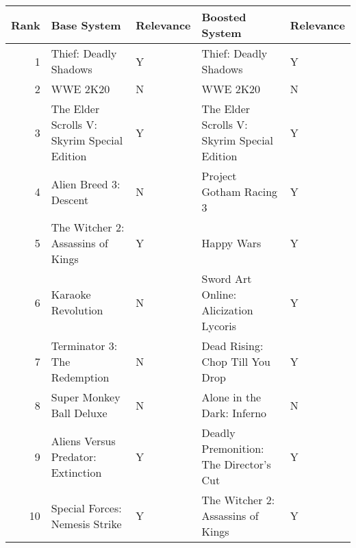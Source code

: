 \begin{tabular}{rllll}
\toprule
 Rank &                                 Base System & Relevance &                              Boosted System & Relevance \\
\midrule
    1 &                       Thief: Deadly Shadows &         Y &                       Thief: Deadly Shadows &         Y \\
    2 &                                    WWE 2K20 &         N &                                    WWE 2K20 &         N \\
    3 & The Elder Scrolls V: Skyrim Special Edition &         Y & The Elder Scrolls V: Skyrim Special Edition &         Y \\
    4 &                      Alien Breed 3: Descent &         N &                     Project Gotham Racing 3 &         Y \\
    5 &           The Witcher 2: Assassins of Kings &         Y &                                  Happy Wars &         Y \\
    6 &                          Karaoke Revolution &         N &       Sword Art Online: Alicization Lycoris &         Y \\
    7 &                Terminator 3: The Redemption &         N &             Dead Rising: Chop Till You Drop &         Y \\
    8 &                    Super Monkey Ball Deluxe &         N &                  Alone in the Dark: Inferno &         N \\
    9 &          Aliens Versus Predator: Extinction &         Y &      Deadly Premonition: The Director's Cut &         Y \\
   10 &              Special Forces: Nemesis Strike &         Y &           The Witcher 2: Assassins of Kings &         Y \\
\bottomrule
\end{tabular}
